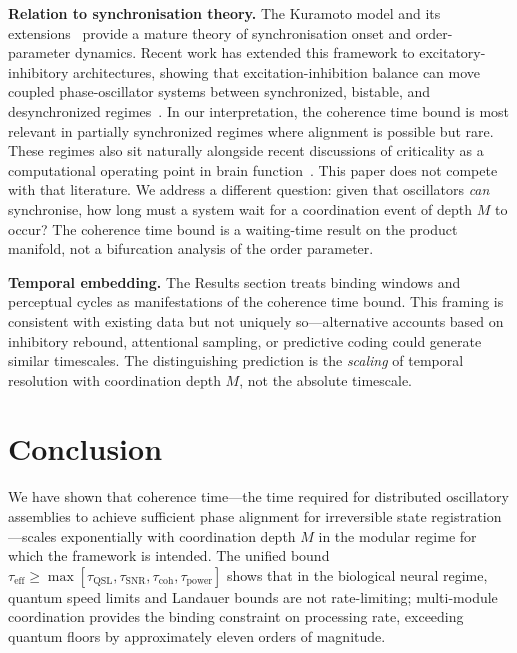 \documentclass[12pt]{article}
\begin{document}
\textbf{Relation to synchronisation theory.} The Kuramoto model and its extensions~\cite{kuramoto1984, strogatz2000, acebron2005, ott2008} provide a mature theory of synchronisation onset and order-parameter dynamics. Recent work has extended this framework to excitatory-inhibitory architectures, showing that excitation-inhibition balance can move coupled phase-oscillator systems between synchronized, bistable, and desynchronized regimes~\cite{kuroki2025}. In our interpretation, the coherence time bound is most relevant in partially synchronized regimes where alignment is possible but rare. These regimes also sit naturally alongside recent discussions of criticality as a computational operating point in brain function~\cite{hengen2025}. This paper does not compete with that literature. We address a different question: given that oscillators \emph{can} synchronise, how long must a system wait for a coordination event of depth $M$ to occur? The coherence time bound is a waiting-time result on the product manifold, not a bifurcation analysis of the order parameter.

\textbf{Temporal embedding.} The Results section treats binding windows and perceptual cycles as manifestations of the coherence time bound. This framing is consistent with existing data but not uniquely so---alternative accounts based on inhibitory rebound, attentional sampling, or predictive coding could generate similar timescales. The distinguishing prediction is the \emph{scaling} of temporal resolution with coordination depth $M$, not the absolute timescale.

\section{Conclusion}

We have shown that coherence time---the time required for distributed oscillatory assemblies to achieve sufficient phase alignment for irreversible state registration---scales exponentially with coordination depth $M$ in the modular regime for which the framework is intended. The unified bound $\tau_{\text{eff}} \geq \max[\tau_{\text{QSL}}, \tau_{\text{SNR}}, \tau_{\text{coh}}, \tau_{\text{power}}]$ shows that in the biological neural regime, quantum speed limits and Landauer bounds are not rate-limiting; multi-module coordination provides the binding constraint on processing rate, exceeding quantum floors by approximately eleven orders of magnitude.
\end{document}
